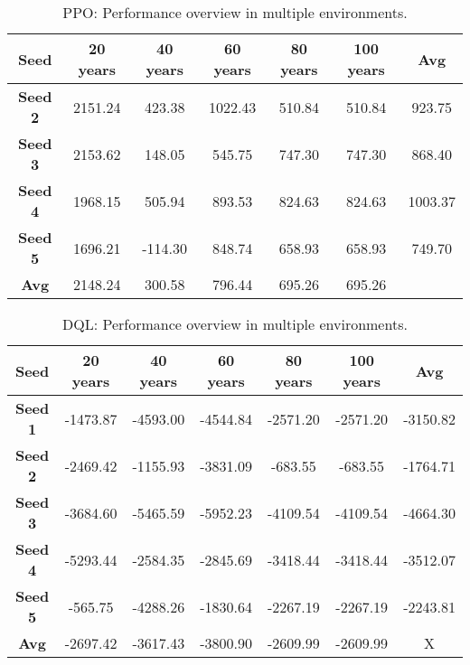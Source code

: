 
\begin{table}[h]
    \centering
        \begin{tabular}{|c|c|c|c|c|c||c|}
            \hline
            \textbf{Seed} & \textbf{20 years} & \textbf{40 years} & \textbf{60 years} & {80 years} & {100 years} & \textbf{Avg}\\
            \hline
            \textbf{Seed 2} & 2151.24 & 423.38 & 1022.43 & 510.84 & 510.84 & 923.75 \\
            \hline
            \textbf{Seed 3} & 2153.62 & 148.05 & 545.75 & 747.30 & 747.30 & 868.40 \\
            \hline
            \textbf{Seed 4} & 1968.15 & 505.94 & 893.53 & 824.63 & 824.63 & 1003.37 \\
            \hline
            \textbf{Seed 5} & 1696.21 & -114.30 & 848.74 & 658.93 & 658.93 & 749.70 \\
            \hline
            \hline
            \textbf{Avg} & 2148.24 & 300.58 & 796.44 & 695.26 & 695.26 &  \\
            \hline
        \end{tabular}
        \caption{PPO: Performance overview in multiple environments.}
        \label{eval:ppo}
\end{table}

\begin{table}[h]
    \centering
    \begin{tabular}{|c|c|c|c|c|c||c|}
        \hline
        \textbf{Seed} & \textbf{20 years} & \textbf{40 years} & \textbf{60 years} & {80 years} & {100 years} & \textbf{Avg}\\
        \hline
        \textbf{Seed 1} & -1473.87 & -4593.00 & -4544.84 & -2571.20 & -2571.20 & -3150.82 \\
        \hline
        \textbf{Seed 2} & -2469.42 & -1155.93 & -3831.09 & -683.55 & -683.55 & -1764.71 \\
        \hline
        \textbf{Seed 3} & -3684.60 & -5465.59 & -5952.23 & -4109.54 & -4109.54 & -4664.30 \\
        \hline
        \textbf{Seed 4} & -5293.44 & -2584.35 & -2845.69 & -3418.44 & -3418.44 & -3512.07 \\
        \hline
        \textbf{Seed 5} & -565.75 & -4288.26 & -1830.64 & -2267.19 & -2267.19 & -2243.81 \\
        \hline
        \hline
        \textbf{Avg} & -2697.42 & -3617.43 & -3800.90 & -2609.99 & -2609.99 &  X\\
        \hline
    \end{tabular}
    \caption{DQL: Performance overview in multiple environments.}
\end{table}


